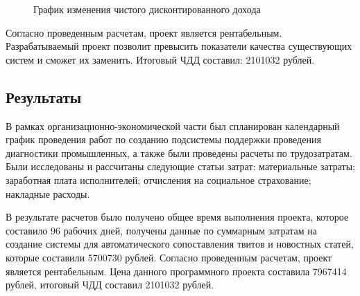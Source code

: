         \begin{figure}[h!]
            \centering
            \caption{График изменения чистого дисконтированного дохода}
            \label{pic:npv}
        \end{figure}

        Согласно проведенным расчетам, проект является рентабельным.
        Разрабатываемый проект позволит превысить показатели качества существующих систем и сможет их заменить.
        Итоговый ЧДД составил: 2101032 рублей.

    \subsection{Результаты}
        В рамках организационно-экономической части был спланирован календарный график проведения работ по созданию подсистемы поддержки проведения диагностики промышленных, а также были проведены расчеты по трудозатратам.
        Были исследованы и рассчитаны следующие статьи затрат: материальные затраты; заработная плата исполнителей; отчисления на социальное страхование; накладные расходы.

        В результате расчетов было получено общее время выполнения проекта, которое составило 96 рабочих дней,
        получены данные по суммарным затратам на создание системы для автоматического сопоставления твитов и новостных статей, которые составили 5700730 рублей.
        Согласно проведенным расчетам, проект является рентабельным.
        Цена данного программного проекта составила 7967414 рублей, итоговый ЧДД составил 2101032 рублей.

